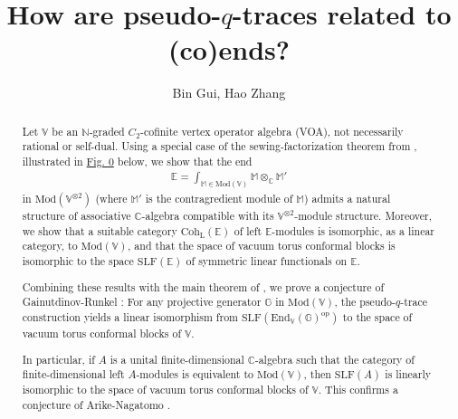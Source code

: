 \documentclass[11pt,b5paper,notitlepage]{article}
\title{How are pseudo-$q$-traces related to (co)ends?}
\author{{\sc Bin Gui, Hao Zhang}
}
\date{}
\theoremstyle{definition}
\theoremstyle{plain}
\newcommand{\End}{\mathrm{End}} %
\newcommand{\opp}{\mathrm{op}}
\newcommand{\SLF}{\mathrm{SLF}}
\newcommand{\Vbb}{\mathbb V}
\newcommand{\Mbb}{\mathbb M}
\newcommand{\Gbb}{\mathbb G}
\newcommand{\Cbb}{\mathbb C}
\newcommand{\Nbb}{\mathbb N}
\newcommand{\Ebb}{\mathbb E}
\newcommand{\<}{\left\langle}
\renewcommand{\>}{\right\rangle}
\newcommand{\Mod}{\mathrm{Mod}}
\newcommand{\Coh}{{\mathrm{Coh}_{\mathrm L}}}
\numberwithin{equation}{section}
\begin{document}
\sloppy %
	\setcounter{section}{-1}
	
	
	
	\maketitle
	
	
\newcommand\blfootnote[1]{%
	\begingroup
	\renewcommand\thefootnote{}\footnote{#1}%
	\addtocounter{footnote}{-1}%
	\endgroup
}




\begin{abstract}
Let $\Vbb$ be an $\Nbb$-graded $C_2$-cofinite vertex operator algebra (VOA), not necessarily rational or self-dual. Using a special case of the sewing-factorization theorem from \cite{GZ3}, illustrated in \hyperlink{figsfend}{Fig. 0} below, we show that the end
\begin{align*}
\Ebb=\int_{\Mbb\in\Mod(\Vbb)}\Mbb\otimes_\Cbb\Mbb'
\end{align*}
in $\Mod(\Vbb^{\otimes2})$ (where $\Mbb'$ is the contragredient module of $\Mbb$) admits a natural structure of associative $\Cbb$-algebra compatible with its $\Vbb^{\otimes2}$-module structure. Moreover, we show that a suitable category $\Coh(\Ebb)$ of left $\Ebb$-modules is isomorphic, as a linear category, to $\Mod(\Vbb)$, and that the space of vacuum torus conformal blocks is isomorphic to the space $\SLF(\Ebb)$ of symmetric linear functionals on $\Ebb$.

Combining these results with the main theorem of \cite{GZ4}, we prove a conjecture of Gainutdinov-Runkel \cite{GR-Verlinde}: For any projective generator $\Gbb$ in $\Mod(\Vbb)$, the pseudo-$q$-trace construction yields a linear isomorphism from $\SLF(\End_\Vbb(\Gbb)^\opp)$ to the space of vacuum torus conformal blocks of $\Vbb$. 

In particular, if $A$ is a unital finite-dimensional $\Cbb$-algebra such that the category of finite-dimensional left $A$-modules is equivalent to $\Mod(\Vbb)$, then $\SLF(A)$ is linearly isomorphic to the space of vacuum torus conformal blocks of $\Vbb$. This confirms a conjecture of Arike-Nagatomo \cite{AN-pseudo-trace}.
\end{abstract}
\end{document}
